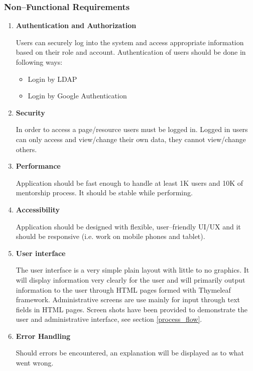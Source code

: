 \documentclass[10pt]{article}
\begin{document}
\subsubsection{Non--Functional Requirements} \label{nonfunctional_requirements}
\begin{enumerate}

\item \textbf{Authentication and Authorization}

Users can securely log into the system and access appropriate information based on their
role and account. Authentication of users should be done in following ways:
\begin{itemize}
    \item Login by LDAP
    \item Login by Google Authentication
\end{itemize}


\item \textbf{Security}

In order to access a page/resource users must be logged in. Logged in users can only access
and view/change their own data, they cannot view/change others.


\item \textbf{Performance}

Application should be fast enough to handle at least 1K users and 10K of mentorship process.
It should be stable while performing.


\item \textbf{Accessibility}

Application should be designed with flexible, user--friendly UI/UX and it should be
responsive (i.e. work on mobile phones and tablet).


\item \textbf{User interface}

The user interface is a very simple plain layout with little to no graphics. It will display
information very clearly for the user and will primarily output information to the user
through HTML pages formed with Thymeleaf framework. Administrative screens are use mainly
for input through text fields in HTML pages. Screen shots have been provided to demonstrate
the user and administrative interface, see section \ref{process_flow}.


\item \textbf{Error Handling}

Should errors be encountered, an explanation will be displayed as to what went wrong.


\end{enumerate}
\end{document}
